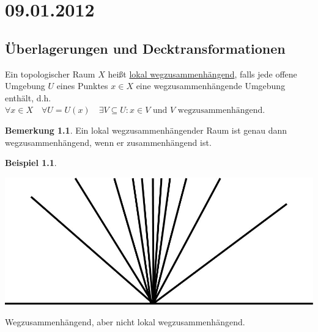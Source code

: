 \documentclass[a4paper,11pt,notitlepage]{report}
\theoremstyle{definition}
\newtheorem{remark}{Bemerkung}[chapter]
\newtheorem{example}{Beispiel}[chapter]
\begin{document}
\chapter{09.01.2012}

\section{Überlagerungen und Decktransformationen}

\begin{definition}
	Ein topologischer Raum $X$ heißt \underline{lokal wegzusammenhängend}, falls jede offene Umgebung $U$ eines Punktes $x \in X$ eine wegzusammenhängende Umgebung enthält, d.h. $\forall x \in X \quad \forall U = U(x) \quad \exists V \subseteq U \colon x \in V \text{ und } V \text{ wegzusammenhängend}.$
\end{definition}

\begin{remark}
	Ein lokal wegzusammenhängender Raum ist genau dann wegzusammenhängend, wenn er zusammenhängend ist.
\end{remark}

\begin{example}
	
\begin{center}
	\includegraphics[scale=0.5]{images/2012_01_09_Bild1.jpg}
\end{center} Wegzusammenhängend, aber nicht lokal wegzusammenhängend.
\end{example}
\end{document}
